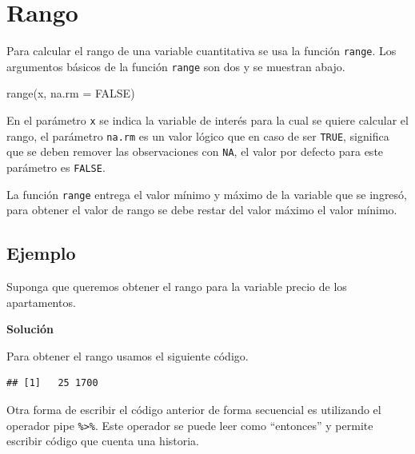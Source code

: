 \documentclass[
]{book}
\makeatletter
\newenvironment{Shaded}{\begin{snugshade}}{\end{snugshade}}
\newcommand{\AttributeTok}[1]{\textcolor[rgb]{0.77,0.63,0.00}{#1}}
\newcommand{\ConstantTok}[1]{\textcolor[rgb]{0.00,0.00,0.00}{#1}}
\newcommand{\FunctionTok}[1]{\textcolor[rgb]{0.00,0.00,0.00}{#1}}
\newcommand{\NormalTok}[1]{#1}
\newcommand{\SpecialCharTok}[1]{\textcolor[rgb]{0.00,0.00,0.00}{#1}}
\newenvironment{kframe}{%
\medskip{}
\setlength{\fboxsep}{.8em}
 \def\at@end@of@kframe{}%
 \ifinner\ifhmode%
  \def\at@end@of@kframe{\end{minipage}}%
  \begin{minipage}{\columnwidth}%
 \fi\fi%
 \def\FrameCommand##1{\hskip\@totalleftmargin \hskip-\fboxsep
 \colorbox{shadecolor}{##1}\hskip-\fboxsep
     \hskip-\linewidth \hskip-\@totalleftmargin \hskip\columnwidth}%
 \MakeFramed {\advance\hsize-\width
   \@totalleftmargin\z@ \linewidth\hsize
   \@setminipage}}%
 {\par\unskip\endMakeFramed%
 \at@end@of@kframe}
\renewenvironment{Shaded}{\begin{kframe}}{\end{kframe}}
\makeatother
\begin{document}
\hypertarget{rango}{%
\section{\texorpdfstring{Rango  }{Rango  }}\label{rango}}

Para calcular el rango de una variable cuantitativa se usa la función \texttt{range}. Los argumentos básicos de la función \texttt{range} son dos y se muestran abajo.

\begin{Shaded}
\begin{Highlighting}[]
\FunctionTok{range}\NormalTok{(x, }\AttributeTok{na.rm =} \ConstantTok{FALSE}\NormalTok{)}
\end{Highlighting}
\end{Shaded}

En el parámetro \texttt{x} se indica la variable de interés para la cual se quiere calcular el rango, el parámetro \texttt{na.rm} es un valor lógico que en caso de ser \texttt{TRUE}, significa que se deben remover las observaciones con \texttt{NA}, el valor por defecto para este parámetro es \texttt{FALSE}.

La función \texttt{range} entrega el valor mínimo y máximo de la variable que se ingresó, para obtener el valor de rango se debe restar del valor máximo el valor mínimo.

\hypertarget{ejemplo-35}{%
\subsection*{Ejemplo}\label{ejemplo-35}}

Suponga que queremos obtener el rango para la variable precio de los apartamentos.

\textbf{Solución}

Para obtener el rango usamos el siguiente código.

\begin{Shaded}
\end{Shaded}

\begin{verbatim}
## [1]   25 1700
\end{verbatim}

Otra forma de escribir el código anterior de forma secuencial es utilizando el operador pipe \texttt{\%\textgreater{}\%}. Este operador se puede leer como ``entonces'' y permite escribir código que cuenta una historia.
\end{document}
